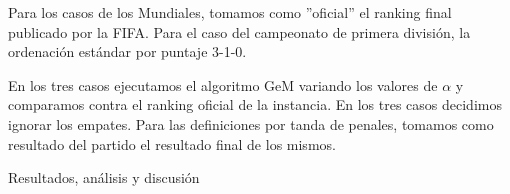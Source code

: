 \begin{LaTeXdescription}
        \par Para los casos de los Mundiales, tomamos como ''oficial'' el
        ranking final publicado por la FIFA. Para el caso del campeonato de
        primera división, la ordenación estándar por puntaje 3-1-0.

        \par En los tres casos ejecutamos el algoritmo GeM variando los valores
        de $\alpha$ y comparamos contra el ranking oficial de la instancia. En
        los tres casos decidimos ignorar los empates. Para las definiciones por
        tanda de penales, tomamos como resultado del partido el resultado final
        de los mismos.\\

    \item[Resultados, an\'alisis y discusi\'on]
\end{LaTeXdescription}

